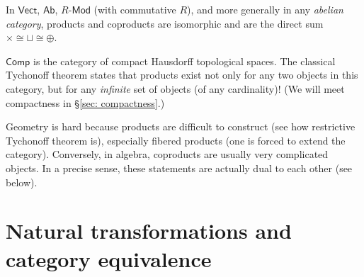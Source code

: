 \begin{example}
    In $\mathsf{Vect}$, $\mathsf{Ab}$, $R\text{-}\mathsf{Mod}$ (with commutative $R$), and more generally in any \emph{abelian category}, products and coproducts are isomorphic and are the direct sum $\times\cong\sqcup\cong\oplus$.
\end{example}
%
\begin{example}
    $\mathsf{Comp}$ is the category of compact Hausdorff topological
    spaces. The classical Tychonoff theorem states that products exist
    not only for any two objects in this category, but for any \emph{infinite}
    set of objects (of any cardinality)! (We will meet compactness in \S\ref{sec: compactness}.)
\end{example}
%
\begin{rem}
    Geometry is hard because products are difficult to construct (see
    how restrictive Tychonoff theorem is), especially fibered products
    (one is forced to extend the category). Conversely, in algebra, coproducts
    are usually very complicated objects. In a precise sense, these statements
    are actually dual to each other (see below).
\end{rem}



\section{Natural transformations and category equivalence}

